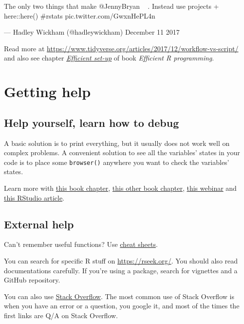 \documentclass[]{book}
\theoremstyle{definition}
\theoremstyle{definition}
\theoremstyle{definition}
\theoremstyle{remark}
\begin{document}
The only two things that make @JennyBryan 😤😠🤯. Instead use projects +
here::here() \#rstats pic.twitter.com/GwxnHePL4n

--- Hadley Wickham (@hadleywickham) December 11 2017

Read more at
\url{https://www.tidyverse.org/articles/2017/12/workflow-vs-script/} and
also see chapter
\href{https://bookdown.org/csgillespie/efficientR/set-up.html}{\emph{Efficient
set-up}} of book \emph{Efficient R programming}.

\section{Getting help}\label{getting-help}

\subsection{Help yourself, learn how to
debug}\label{help-yourself-learn-how-to-debug}

A basic solution is to print everything, but it usually does not work
well on complex problems. A convenient solution to see all the
variables' states in your code is to place some \texttt{browser()}
anywhere you want to check the variables' states.

Learn more with
\href{https://bookdown.org/rdpeng/rprogdatascience/debugging.html}{this
book chapter},
\href{http://adv-r.had.co.nz/Exceptions-Debugging.html}{this other book
chapter},
\href{https://www.rstudio.com/resources/videos/debugging-techniques-in-rstudio/}{this
webinar} and
\href{https://support.rstudio.com/hc/en-us/articles/205612627-Debugging-with-RStudio}{this
RStudio article}.

\subsection{External help}\label{external-help}

Can't remember useful functions? Use
\href{https://www.rstudio.com/resources/cheatsheets/}{cheat sheets}.

You can search for specific R stuff on \url{https://rseek.org/}. You
should also read documentations carefully. If you're using a package,
search for vignettes and a GitHub repository.

You can also use \href{https://stackoverflow.com/}{Stack Overflow}. The
most common use of Stack Overflow is when you have an error or a
question, you google it, and most of the times the first links are Q/A
on Stack Overflow.
\end{document}
